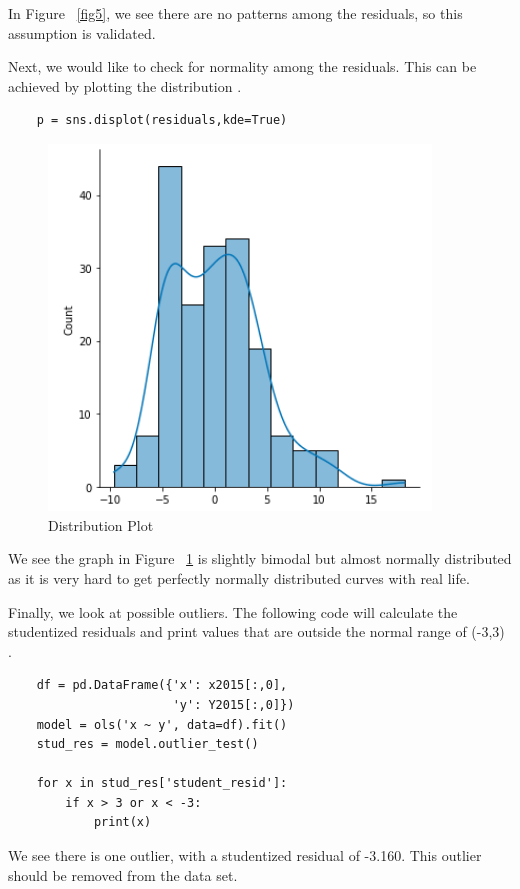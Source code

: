 \documentclass[12pt]{article}
\begin{document}
In Figure ~\ref{fig5}, we see there are no patterns among the residuals, so this assumption is validated.

Next, we would like to check for normality among the residuals. This can be achieved by plotting the distribution \citep{kaggleassumptions}.

\begin{verbatim}
    p = sns.displot(residuals,kde=True)
\end{verbatim}

\begin{figure}
    \centering
    \includegraphics[width=4in]{Figures/figure4.png}
    \caption{Distribution Plot}
    \label{fig6}
\end{figure}

We see the graph in Figure ~\ref{fig6} is slightly bimodal but almost normally distributed as it is very hard to get perfectly normally distributed curves with real life.

Finally, we look at possible outliers. The following code will calculate the studentized residuals and print values that are outside the normal range of (-3,3) \citep{statologyresiduals}.

\begin{verbatim}
    df = pd.DataFrame({'x': x2015[:,0],
                       'y': Y2015[:,0]})
    model = ols('x ~ y', data=df).fit()
    stud_res = model.outlier_test()
    
    for x in stud_res['student_resid']:
        if x > 3 or x < -3:
            print(x)
\end{verbatim}

We see there is one outlier, with a studentized residual of -3.160. This outlier should be removed from the data set.
\end{document}

